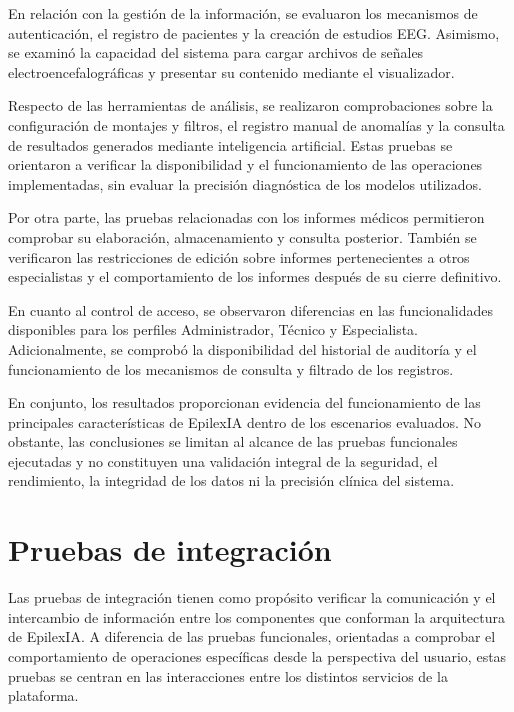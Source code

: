 En relación con la gestión de la información, se evaluaron los mecanismos de autenticación, el registro de pacientes y la creación de estudios EEG. Asimismo, se examinó la capacidad del sistema para cargar archivos de señales electroencefalográficas y presentar su contenido mediante el visualizador.

Respecto de las herramientas de análisis, se realizaron comprobaciones sobre la configuración de montajes y filtros, el registro manual de anomalías y la consulta de resultados generados mediante inteligencia artificial. Estas pruebas se orientaron a verificar la disponibilidad y el funcionamiento de las operaciones implementadas, sin evaluar la precisión diagnóstica de los modelos utilizados.

Por otra parte, las pruebas relacionadas con los informes médicos permitieron comprobar su elaboración, almacenamiento y consulta posterior. También se verificaron las restricciones de edición sobre informes pertenecientes a otros especialistas y el comportamiento de los informes después de su cierre definitivo.

En cuanto al control de acceso, se observaron diferencias en las funcionalidades disponibles para los perfiles Administrador, Técnico y Especialista. Adicionalmente, se comprobó la disponibilidad del historial de auditoría y el funcionamiento de los mecanismos de consulta y filtrado de los registros.

En conjunto, los resultados proporcionan evidencia del funcionamiento de las principales características de EpilexIA dentro de los escenarios evaluados. No obstante, las conclusiones se limitan al alcance de las pruebas funcionales ejecutadas y no constituyen una validación integral de la seguridad, el rendimiento, la integridad de los datos ni la precisión clínica del sistema.


\section{Pruebas de integración}
\label{sec:pruebas_integracion}


Las pruebas de integración tienen como propósito verificar la comunicación y el intercambio de información entre los componentes que conforman la arquitectura de EpilexIA. A diferencia de las pruebas funcionales, orientadas a comprobar el comportamiento de operaciones específicas desde la perspectiva del usuario, estas pruebas se centran en las interacciones entre los distintos servicios de la plataforma.

